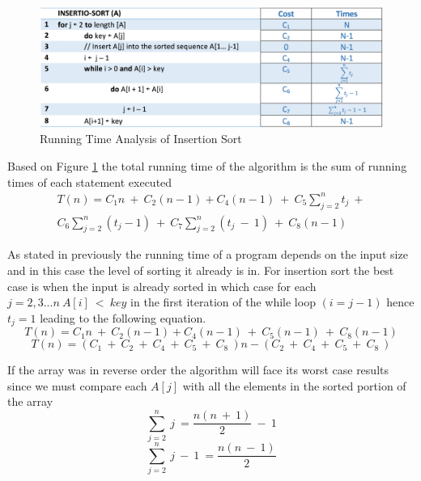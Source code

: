 \documentclass[12pt,a4paper]{book}
\begin{document}
\begin{figure}[h]
    \centering
    \label{fig:InsertionRunTime}
    \includegraphics[width=\textwidth]{InsertionRunTime}
    \caption{Running Time Analysis of Insertion Sort}   
\end{figure}
\par Based on {Figure \ref{fig:InsertionRunTime}} the total running time of the algorithm is the sum of running times of each statement executed
\begin{equation}
\begin{aligned}
T(n) = C_{1}n\  +\  C_{2}(n-1) + C_{4}(n-1)\ +\ C_{5}\sum_{j=2}^{n} t_{j}\  +\\
 C_{6}\sum_{j=2}^{n} (t_{j} -1)\ +\ C_{7}\sum_{j=2}^{n} (t_{j}\ -\ 1)\ +\ C_{8}(n - 1)
\end{aligned}
\end{equation}
\par As stated in previously the running time of a program depends on the input size and in this case the level of sorting it already is in. For insertion sort the best case is when the input is already sorted in which case for each $j = 2,3 ... n\ A[i]\ <\ key$ in the first iteration of the while loop $(i = j - 1)$ hence $t_{j} = 1$ leading to the following equation.
\begin{equation}
T(n) = C_{1}n\  +\  C_{2}(n-1) + C_{4}(n-1)\ +\ C_{5}(n-1)\  +\ C_{8}(n - 1)
\end{equation}
\begin{equation}
T(n) = (C_{1}\  +\  C_{2}\ +\ C_{4}\  +\ C_{5}\  +\ C_{8}\ )n - (C_{2}\ +\ C_{4}\  +\ C_{5}\  +\ C_{8}\ )
\end{equation}
\par If the array was in reverse order the algorithm will face its worst case results since we must compare each $A[j]$ with all the elements in the sorted portion of the array
\begin{equation}
\sum_{j=2}^{n}\ j\ = \frac{n(n\ +\ 1)}{2}\ -\ 1
\end{equation}
\begin{equation}
\sum_{j=2}^{n}\ j\ -\ 1\ = \frac{n(n\ -\ 1)}{2}
\end{equation}
\end{document}
